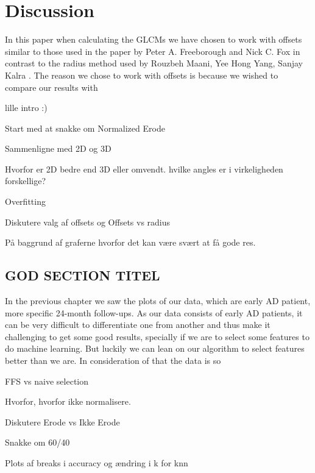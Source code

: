 \chapter{Discussion}

In this paper when calculating the GLCMs we have chosen to work with offsets similar to those used in the paper by Peter A. Freeborough and Nick C. Fox \cite{MRfreeborough} in contrast to the radius method used by Rouzbeh Maani, Yee Hong Yang, Sanjay Kalra \cite{Voxel}.
The reason we chose to work with offsets is because we wished to compare our results with \cite{MRfreeborough}


lille intro :)

Start med at snakke om Normalized Erode

Sammenligne med 2D og 3D

Hvorfor er 2D bedre end 3D eller omvendt. hvilke angles er i virkeligheden forskellige?

Overfitting

Diskutere valg af offsets og Offsets vs radius



På baggrund af graferne hvorfor det kan være svært at få gode res.

\section{GOD SECTION TITEL}
In the previous chapter we saw the plots of our data, which are early AD patient, more specific 24-month follow-ups. As our data consists of early AD patients, it can be very difficult to differentiate one from another and thus make it challenging to get some good results, specially if we are to select some features to do machine learning. But luckily we can lean on our algorithm to select features better than we are. In consideration of that the data is so

FFS vs naive selection


Hvorfor, hvorfor ikke normalisere.

Diskutere Erode vs Ikke Erode

Snakke om 60/40

Plots af breaks i accuracy og ændring i k for knn 